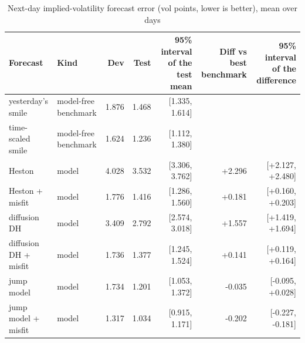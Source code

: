 \begin{table}[ht]
\centering
\small
\caption{Next-day implied-volatility forecast error (vol points, lower is better), mean over days}
\begin{tabular}{llrrrrr}
\toprule
Forecast & Kind & Dev & Test & 95\% interval of the test mean & Diff vs best benchmark & 95\% interval of the difference \\
\midrule
yesterday's smile & model-free benchmark & 1.876 & 1.468 & [1.335, 1.614] &  &  \\
time-scaled smile & model-free benchmark & 1.624 & 1.236 & [1.112, 1.380] &  &  \\
Heston & model & 4.028 & 3.532 & [3.306, 3.762] & +2.296 & [+2.127, +2.480] \\
Heston + misfit & model & 1.776 & 1.416 & [1.286, 1.560] & +0.181 & [+0.160, +0.203] \\
diffusion DH & model & 3.409 & 2.792 & [2.574, 3.018] & +1.557 & [+1.419, +1.694] \\
diffusion DH + misfit & model & 1.736 & 1.377 & [1.245, 1.524] & +0.141 & [+0.119, +0.164] \\
jump model & model & 1.734 & 1.201 & [1.053, 1.372] & -0.035 & [-0.095, +0.028] \\
jump model + misfit & model & 1.317 & 1.034 & [0.915, 1.171] & -0.202 & [-0.227, -0.181] \\
\bottomrule
\end{tabular}
\par{}
\end{table}
